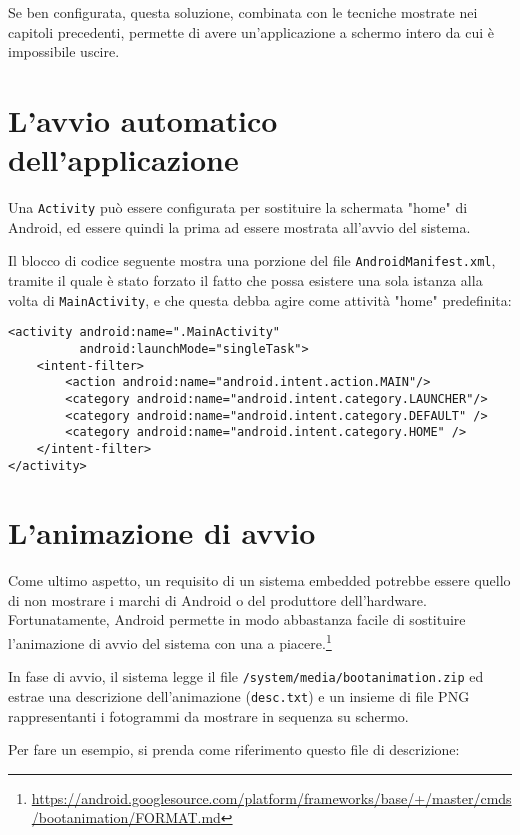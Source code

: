 Se ben configurata, questa soluzione, combinata con le tecniche mostrate nei capitoli precedenti, permette di avere un'applicazione a schermo intero da cui è impossibile uscire.

\section{L'avvio automatico dell'applicazione}
\label{sec:kiosk_launcher}

Una \texttt{Activity} può essere configurata per sostituire la schermata "home" di Android, ed essere quindi la prima ad essere mostrata all'avvio del sistema.

Il blocco di codice seguente mostra una porzione del file \texttt{AndroidManifest.xml}, tramite il quale è stato forzato il fatto che possa esistere una sola istanza alla volta di \texttt{MainActivity}, e che questa debba agire come attività "home" predefinita:

\begin{verbatim}
<activity android:name=".MainActivity"
          android:launchMode="singleTask">
    <intent-filter>
        <action android:name="android.intent.action.MAIN"/>
        <category android:name="android.intent.category.LAUNCHER"/>
        <category android:name="android.intent.category.DEFAULT" />
        <category android:name="android.intent.category.HOME" />
    </intent-filter>
</activity>
\end{verbatim}

\section{L'animazione di avvio}
\label{sec:kiosk_bootanimation}

Come ultimo aspetto, un requisito di un sistema embedded potrebbe essere quello di non mostrare i marchi di Android o del produttore dell'hardware. Fortunatamente, Android permette in modo abbastanza facile di sostituire l'animazione di avvio del sistema con una a piacere.\footnote{\url{https://android.googlesource.com/platform/frameworks/base/+/master/cmds/bootanimation/FORMAT.md}}

In fase di avvio, il sistema legge il file \texttt{/system/media/bootanimation.zip} ed estrae una descrizione dell'animazione (\texttt{desc.txt}) e un insieme di file PNG rappresentanti i fotogrammi da mostrare in sequenza su schermo.

Per fare un esempio, si prenda come riferimento questo file di descrizione:

